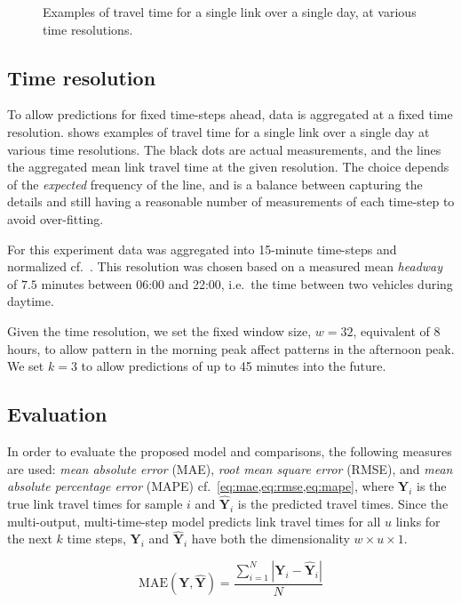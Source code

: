 \documentclass[preprint,11pt,5p,twocolumn]{elsarticle}
\newcommand{\matr}[1]{\mathbf{#1}}
\begin{document}
\begin{figure}[!t]
    \caption{Examples of travel time for a single link over a single day, at various time resolutions.}
    \label{fig:resolutions}
\end{figure}

\subsection{Time resolution}
To allow predictions for fixed time-steps ahead, data is aggregated at a fixed time resolution.  shows examples of travel time for a single link over a single day at various time resolutions. The black dots are actual measurements, and the lines the aggregated mean link travel time at the given resolution. The choice depends of the \emph{expected} frequency of the line, and is a balance between capturing the details and still having a reasonable number of measurements of each time-step to avoid over-fitting.

For this experiment data was aggregated into 15-minute time-steps and normalized cf.~. This resolution was chosen based on a measured mean \emph{headway} of $7.5$ minutes between 06:00 and 22:00, i.e.\ the time between two vehicles during daytime.

Given the time resolution, we set the fixed window size, $w = 32$, equivalent of 8 hours, to allow pattern in the morning peak affect patterns in the afternoon peak. We set $k = 3$ to allow predictions of up to 45 minutes into the future. 

\subsection{Evaluation}
In order to evaluate the proposed model and comparisons, the following measures are used: \emph{mean absolute error} (MAE), \emph{root mean square error} (RMSE), and \emph{mean absolute percentage error} (MAPE) cf.~\cref{eq:mae,eq:rmse,eq:mape}, where $\matr{Y}_i$ is the true link travel times for sample $i$ and $\matr{\widehat{Y}}_i$ is the predicted travel times. Since the multi-output, multi-time-step model predicts link travel times for all $u$ links for the next $k$ time steps, $\matr{Y}_i$ and $\matr{\widehat{Y}}_i$ have both the dimensionality $w \times u \times 1$.

\begin{equation}
    \textrm{MAE}(\matr{Y}, \matr{\widehat{Y}}) = \frac{\sum_{i = 1}^{N} \left| \matr{Y}_i - \matr{\widehat{Y}}_i \right| }{N}
    \label{eq:mae}
\end{equation}
\end{document}
